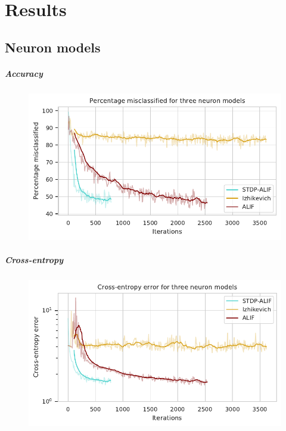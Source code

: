\chapter{Results}\label{ch:results}

\section{Neuron models}
	\paragraph{Accuracy}
		\begin{figure}[ht]
			\centering
		    \includegraphics{gfx/percwrong}
		    \label{fig:accuracy}
		    \caption{}
		\end{figure}

	\paragraph{Cross-entropy}
		\begin{figure}[ht]
			\centering
		    \includegraphics{gfx/crossentropy}
		    \label{fig:crossentropy}
		    \caption{}
		\end{figure}

